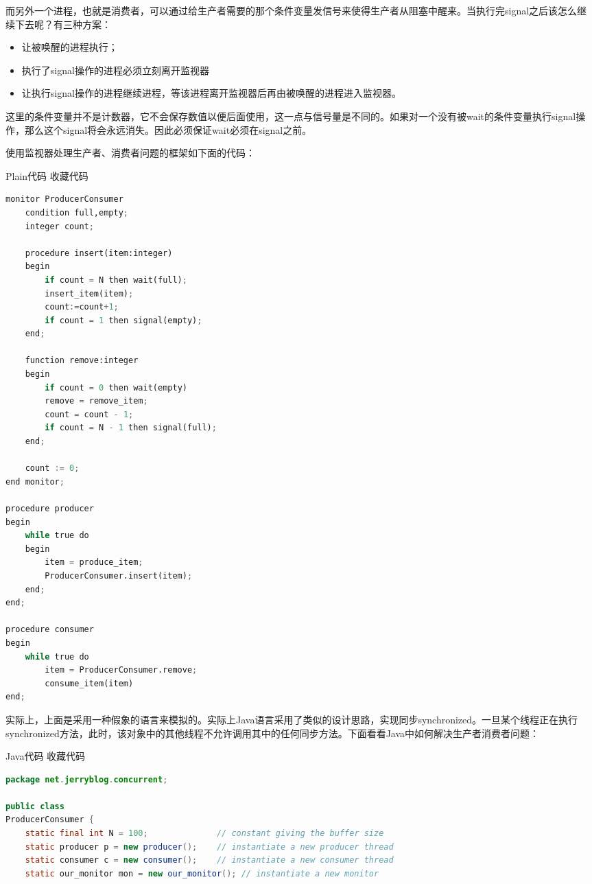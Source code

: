 \documentclass{article}
\begin{document}
\begin{CJK}{UTF8}{gbsn}
    而另外一个进程，也就是消费者，可以通过给生产者需要的那个条件变量发信号来使得生产者从阻塞中醒来。当执行完signal之后该怎么继续下去呢？有三种方案：
 \begin{itemize}
\itemsep=-3pt
\item 让被唤醒的进程执行；
\item 执行了signal操作的进程必须立刻离开监视器
\item 让执行signal操作的进程继续进程，等该进程离开监视器后再由被唤醒的进程进入监视器。
\end{itemize}
    这里的条件变量并不是计数器，它不会保存数值以便后面使用，这一点与信号量是不同的。如果对一个没有被wait的条件变量执行signal操作，那么这个signal将会永远消失。因此必须保证wait必须在signal之前。
 
    使用监视器处理生产者、消费者问题的框架如下面的代码：
 
Plain代码  收藏代码
\begin{lstlisting}[language=Python]
monitor ProducerConsumer  
    condition full,empty;  
    integer count;  
  
    procedure insert(item:integer)  
    begin  
        if count = N then wait(full);  
        insert_item(item);  
        count:=count+1;  
        if count = 1 then signal(empty);  
    end;  
  
    function remove:integer  
    begin   
        if count = 0 then wait(empty)  
        remove = remove_item;  
        count = count - 1;  
        if count = N - 1 then signal(full);  
    end;  
  
    count := 0;  
end monitor;  
  
procedure producer  
begin   
    while true do  
    begin  
        item = produce_item;  
        ProducerConsumer.insert(item);  
    end;  
end;  
  
procedure consumer  
begin  
    while true do  
        item = ProducerConsumer.remove;  
        consume_item(item)  
end;  
\end{lstlisting}
    实际上，上面是采用一种假象的语言来模拟的。实际上Java语言采用了类似的设计思路，实现同步synchronized。一旦某个线程正在执行synchronized方法，此时，该对象中的其他线程不允许调用其中的任何同步方法。下面看看Java中如何解决生产者消费者问题：
 
Java代码  收藏代码
\begin{lstlisting}[language=java]
package net.jerryblog.concurrent;  
  
public class  
ProducerConsumer {  
    static final int N = 100;              // constant giving the buffer size  
    static producer p = new producer();    // instantiate a new producer thread  
    static consumer c = new consumer();    // instantiate a new consumer thread  
    static our_monitor mon = new our_monitor(); // instantiate a new monitor  
   

\end{lstlisting}
\end{CJK}
\end{document}
